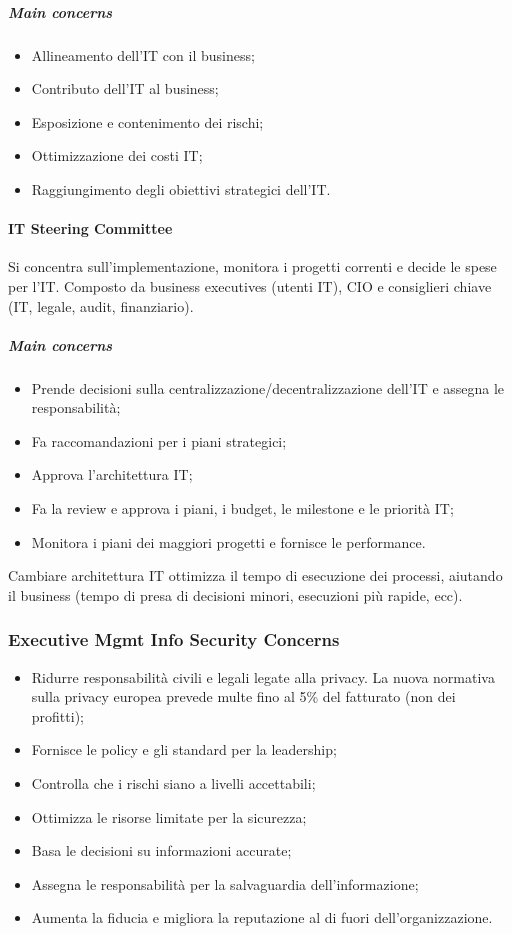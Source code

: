 \subparagraph*{Main concerns}

\begin{itemize}
\item Allineamento dell'IT con il business;
\item Contributo dell'IT al business;
\item Esposizione e contenimento dei rischi;
\item Ottimizzazione dei costi IT;
\item Raggiungimento degli obiettivi strategici dell'IT.
\end{itemize}

\paragraph{IT Steering Committee}

Si concentra sull'implementazione, monitora i progetti correnti e decide le
spese per l'IT. Composto da business executives (utenti IT), CIO e consiglieri
chiave (IT, legale, audit, finanziario).

\subparagraph*{Main concerns}

\begin{itemize}
\item Prende decisioni sulla centralizzazione/decentralizzazione dell'IT e
assegna le responsabilità;
\item Fa raccomandazioni per i piani strategici;
\item Approva l'architettura IT;
\item Fa la review e approva i piani, i budget, le milestone e le priorità IT;
\item Monitora i piani dei maggiori progetti e fornisce le performance.
\end{itemize}

Cambiare architettura IT ottimizza il tempo di esecuzione dei processi, aiutando
il business (tempo di presa di decisioni minori, esecuzioni più rapide, ecc).

\subsubsection{Executive Mgmt Info Security Concerns}

\begin{itemize}
\item Ridurre responsabilità civili e legali legate alla privacy. La nuova normativa
sulla privacy europea prevede multe fino al 5\% del fatturato (non dei
profitti);
\item Fornisce le policy e gli standard per la leadership;
\item Controlla che i rischi siano a livelli accettabili;
\item Ottimizza le risorse limitate per la sicurezza;
\item Basa le decisioni su informazioni accurate;
\item Assegna le responsabilità per la salvaguardia dell'informazione;
\item Aumenta la fiducia e migliora la reputazione al di fuori dell'organizzazione.
\end{itemize}


